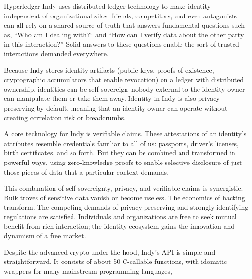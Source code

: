 Hyperledger Indy uses distributed ledger technology to make identity independent of organizational silos; friends, competitors, and even antagonists can all rely on a shared source of truth that answers fundamental questions such as, “Who am I dealing with?” and “How can I verify data about the other party in this interaction?” Solid answers to these questions enable the sort of trusted interactions demanded everywhere.

Because Indy stores identity artifacts (public keys, proofs of existence, cryptographic accumulators that enable revocation) on a ledger with distributed ownership, identities can be self-sovereign--nobody external to the identity owner can manipulate them or take them away. Identity in Indy is also privacy-preserving by default, meaning that an identity owner can operate without creating correlation risk or breadcrumbs.

A core technology for Indy is verifiable claims. These attestations of an identity’s attributes resemble credentials familiar to all of us: passports, driver’s licenses, birth certificates, and so forth. But they can be combined and transformed in powerful ways, using zero-knowledge proofs to enable selective disclosure of just those pieces of data that a particular context demands.

This combination of self-sovereignty, privacy, and verifiable claims is synergistic. Bulk troves of sensitive data vanish or become useless. The economics of hacking transform. The competing demands of privacy-preserving and strongly identifying regulations are satisfied. Individuals and organizations are free to seek mutual benefit from rich interaction; the identity ecosystem gains the innovation and dynamism of a free market. 

Despite the advanced crypto under the hood, Indy’s API is simple and straightforward. It consists of about 50 C-callable functions, with idomatic wrappers for many mainstream programming languages, 

